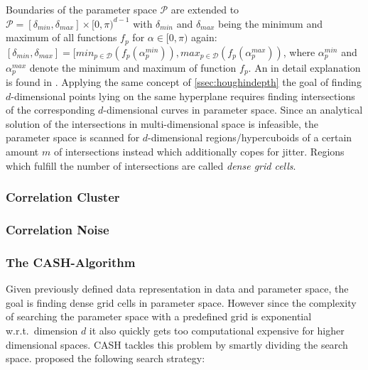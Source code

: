 Boundaries of the parameter space $\mathcal{P}$ are extended to $\mathcal{P} = [\delta_{min}, \delta_{max}]\times [0,\pi)^{d-1}$ with $\delta_{min}$ and $\delta_{max}$ being the minimum and maximum of all functions $f_p$ for $\alpha \in [0,\pi)$ again: $[\delta_{min}, \delta_{max}] = [min_{p \in \mathcal{D}}(f_p(\alpha_p^{min})), max_{p \in \mathcal{D}}(f_p(\alpha_p^{max}))$, where $\alpha_p^{min}$ and $\alpha_p^{max}$ denote the minimum and maximum of function $f_p$. An in detail explanation is found in \textcite{CASHachtert2008robust}.
Applying the same concept of \autoref{ssec:houghindepth} the goal of finding $d$-dimensional points lying on the same hyperplane requires finding intersections of the corresponding $d$-dimensional curves in parameter space. Since an analytical solution of the intersections in multi-dimensional space is infeasible, the parameter space is scanned for $d$-dimensional regions/hypercuboids of a certain amount $m$ of intersections instead which additionally copes for jitter. Regions which fulfill the number of intersections are called \textit{dense grid cells}.

\subsubsection*{Correlation Cluster}

\subsubsection*{Correlation Noise}

\subsubsection*{The CASH-Algorithm}
Given previously defined data representation in data and parameter space, the goal is finding dense grid cells in parameter space. However since the complexity of searching the parameter space with a predefined grid is exponential w.r.t.\ dimension $d$ it also quickly gets too computational expensive for higher dimensional spaces. \ac{CASH} tackles this problem by smartly dividing the search space. \citeauthor{CASHachtert2008robust} proposed the following search strategy:
\vspace{5mm}


